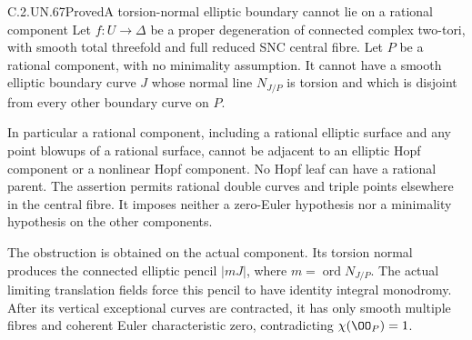 \begin{statement}{C.2.UN.67}{Proved}{A torsion-normal elliptic boundary cannot lie on a rational component}
Let \(f:U\to\Delta\) be a proper degeneration of connected
complex two-tori, with smooth total threefold and full
reduced SNC central fibre. Let \(P\) be a rational
component, with no minimality assumption. It cannot
have a smooth elliptic boundary curve \(J\) whose normal
line \(N_{J/P}\) is torsion and which is disjoint from
every other boundary curve on \(P\).

In particular a rational component, including a rational
elliptic surface and any point blowups of a rational
surface, cannot be adjacent to an elliptic Hopf component
or a nonlinear Hopf component. No Hopf leaf can have a
rational parent. The assertion permits rational double
curves and triple points elsewhere in the central fibre.
It imposes neither a zero-Euler hypothesis nor a
minimality hypothesis on the other components.

The obstruction is obtained on the actual component.
Its torsion normal produces the connected elliptic
pencil \(|mJ|\), where \(m=\operatorname{ord}N_{J/P}\).
The actual limiting translation fields force this
pencil to have identity integral monodromy. After its
vertical exceptional curves are contracted, it has
only smooth multiple fibres and coherent Euler
characteristic zero, contradicting
\(\chi(\OO_P)=1\).
\end{statement}

